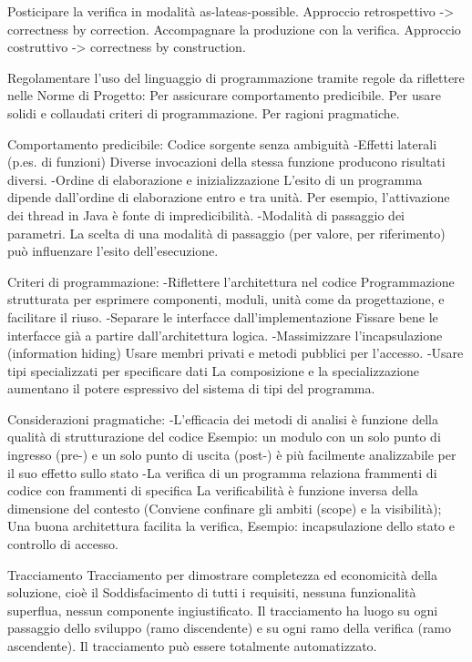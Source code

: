 \documentclass{report}
\begin{document}
Posticipare la verifica in modalità as-lateas-possible. Approccio retrospettivo -> correctness by correction.
Accompagnare la produzione con la verifica. Approccio costruttivo -> correctness by construction.

Regolamentare l’uso del linguaggio di programmazione tramite regole da riflettere nelle Norme di Progetto:
Per assicurare comportamento predicibile. Per usare solidi e collaudati criteri di programmazione. Per ragioni pragmatiche.

Comportamento predicibile:
Codice sorgente senza ambiguità
-Effetti laterali (p.es. di funzioni)
Diverse invocazioni della stessa funzione producono risultati diversi.
-Ordine di elaborazione e inizializzazione
L’esito di un programma dipende dall’ordine di elaborazione entro e tra unità. Per esempio, l’attivazione dei thread in Java è fonte di impredicibilità.
-Modalità di passaggio dei parametri. La scelta di una modalità di passaggio (per valore, per riferimento) può influenzare l’esito dell’esecuzione.

Criteri di programmazione:
-Riflettere l’architettura nel codice
Programmazione strutturata per esprimere componenti, moduli, unità come da progettazione, e facilitare il riuso.
-Separare le interfacce dall’implementazione
Fissare bene le interfacce già a partire dall’architettura logica.
-Massimizzare l’incapsulazione (information hiding)
Usare membri privati e metodi pubblici per l’accesso.
-Usare tipi specializzati per specificare dati
La composizione e la specializzazione aumentano il potere espressivo del sistema di tipi del programma.

Considerazioni pragmatiche:
-L’efficacia dei metodi di analisi è funzione della qualità di strutturazione del codice
Esempio: un modulo con un solo punto di ingresso (pre-) e un solo punto di uscita (post-) è più facilmente analizzabile per il suo effetto sullo stato
-La verifica di un programma relaziona frammenti di codice con frammenti di specifica
La verificabilità è funzione inversa della dimensione del contesto (Conviene confinare gli ambiti (scope) e la visibilità);
Una buona architettura facilita la verifica, Esempio: incapsulazione dello stato e controllo di accesso.

Tracciamento
Tracciamento per dimostrare completezza ed economicità della soluzione, cioè il Soddisfacimento di tutti i requisiti, nessuna funzionalità superflua, nessun componente ingiustificato.
Il tracciamento ha luogo su ogni passaggio dello sviluppo (ramo discendente) e su ogni ramo della verifica (ramo ascendente).
Il tracciamento può essere totalmente automatizzato.
\end{document}
